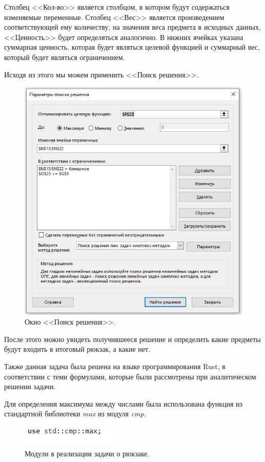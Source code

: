 Столбец <<Кол-во>> является столбцом, в котором будут содержаться изменяемые переменные. Столбец <<Вес>> является произведением соответствующей ему количеству, на значения веса предмета в исходных данных, <<Ценность>> будет определяться аналогично. В нижних ячейках указана суммарная ценность, которая будет являться целевой функцией и суммарный вес, который будет являться ограничением.

Исходя из этого мы можем применить <<Поиск решения>>.
\begin{figure}[h]
  \centering \includegraphics[scale=0.6]{content/images/impl_knapsack3.png}
  \caption{Окно <<Поиск решения>>.}
  \label{fig:impl_knapsack3}
\end{figure}


После этого можно увидеть получившееся решение и определить какие предметы будут входить в итоговый рюкзак, а какие нет.

Также данная задача была решена на языке программирования Rust, в соответствии с теми формулами, которые были рассмотрены при аналитическом решении задачи.

Для определения максимума между числами была использована функция из стандартной библиотеки \textit{max} из модуля \textit{cmp}.
\begin{figure}[h]
  \centering \includegraphics[scale=1]{content/images/impl_knapsack4.png}
  \caption{Модули в реализации задачи о рюкзаке.}
  \label{fig:impl_knapsack4}
\end{figure}

